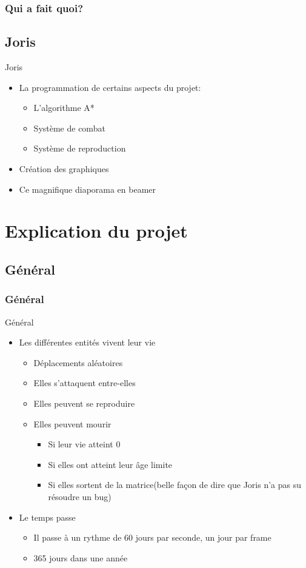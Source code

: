\documentclass{beamer}
\begin{document}
\begin{frame} \frametitle{Qui a fait quoi?}
	\subsection{Joris}
	\begin{block}{Joris} 
		\begin{itemize}
			\item La programmation de certains aspects du projet:
				\begin{itemize}
					\item L'algorithme A*
					\item Système de combat
					\item Système de reproduction
				\end{itemize}
			\item Création des graphiques
			\item Ce magnifique diaporama en beamer
		\end{itemize}
	\end{block}
\end{frame}

\section{Explication du projet}
\subsection{Général}

\begin{frame} \frametitle{Général}
	\begin{block}{Général}
		\begin{itemize}
			\item Les différentes entités vivent leur vie
				\begin{itemize}
					\item Déplacements aléatoires
					\item Elles s'attaquent entre-elles
					\item Elles peuvent se reproduire
					\item Elles peuvent mourir
						\begin{itemize}
							\item Si leur vie atteint 0
							\item Si elles ont atteint leur âge limite
							\item Si elles sortent de la matrice(belle façon de dire que Joris n'a pas su résoudre un bug)
						\end{itemize}
				\end{itemize}
			\item Le temps passe
				\begin{itemize}
					\item Il passe à un rythme de 60 jours par seconde, un jour par frame
			\item 365 jours dans une année
				\end{itemize}
		\end{itemize}
	\end{block}
\end{frame}
\end{document}
